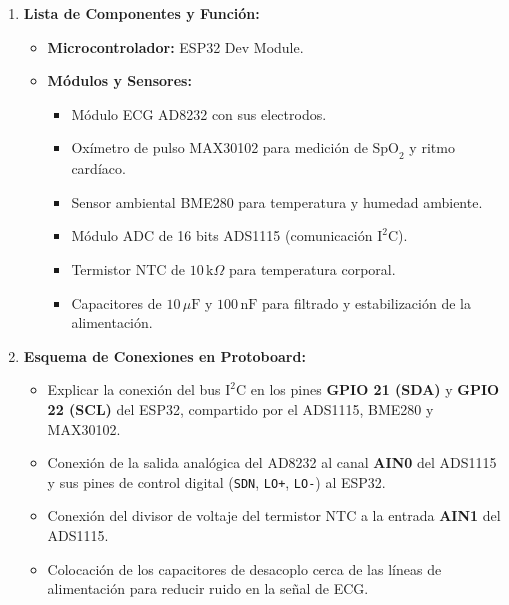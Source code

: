 \documentclass[11pt,a4paper]{article}
\begin{document}
\begin{enumerate}[label=\textbf{\arabic*.}, leftmargin=*]

    \item \textbf{Lista de Componentes y Función:}
    \begin{itemize}
        \item \textbf{Microcontrolador:} ESP32 Dev Module.
        \item \textbf{Módulos y Sensores:}
        \begin{itemize}
            \item Módulo ECG AD8232 con sus electrodos.
            \item Oxímetro de pulso MAX30102 para medición de $\text{SpO}_2$ y ritmo cardíaco.
            \item Sensor ambiental BME280 para temperatura y humedad ambiente.
            \item Módulo ADC de 16 bits ADS1115 (comunicación $\text{I}^2\text{C}$).
            \item Termistor NTC de $10\,\text{k}\Omega$ para temperatura corporal.
            \item Capacitores de $10\,\mu\text{F}$ y $100\,\text{nF}$ para filtrado y estabilización de la alimentación.
        \end{itemize}
    \end{itemize}

    \item \textbf{Esquema de Conexiones en Protoboard:}
    \begin{itemize}
        \item Explicar la conexión del bus $\text{I}^2\text{C}$ en los pines \textbf{GPIO 21 (SDA)} y \textbf{GPIO 22 (SCL)} del ESP32, compartido por el ADS1115, BME280 y MAX30102.
        \item Conexión de la salida analógica del AD8232 al canal \textbf{AIN0} del ADS1115 y sus pines de control digital (\texttt{SDN}, \texttt{LO+}, \texttt{LO-}) al ESP32.
        \item Conexión del divisor de voltaje del termistor NTC a la entrada \textbf{AIN1} del ADS1115.
        \item Colocación de los capacitores de desacoplo cerca de las líneas de alimentación para reducir ruido en la señal de ECG.
    \end{itemize}


\end{enumerate}
\end{document}
